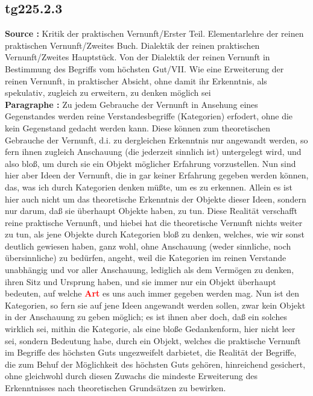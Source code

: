 \documentclass[a4paper,12pt,twoside]{book}
\newcommand{\match}[1]{\textcolor{red}{\textbf{#1}}}
\begin{document}
	\subsection*{tg225.2.3} 
	\textbf{Source : }Kritik der praktischen Vernunft/Erster Teil. Elementarlehre der reinen praktischen Vernunft/Zweites Buch. Dialektik der reinen praktischen Vernunft/Zweites Hauptstück. Von der Dialektik der reinen Vernunft in Bestimmung des Begriffs vom höchsten Gut/VII. Wie eine Erweiterung der reinen Vernunft, in praktischer Absicht, ohne damit ihr Erkenntnis, als spekulativ, zugleich zu erweitern, zu denken möglich sei\\  
	
	\noindent\textbf{Paragraphe : }Zu jedem Gebrauche der Vernunft in Ansehung eines Gegenstandes werden reine Verstandesbegriffe (Kategorien) erfodert, ohne die kein Gegenstand gedacht werden kann. Diese können zum theoretischen Gebrauche der Vernunft, d.i. zu dergleichen Erkenntnis nur angewandt werden, so fern ihnen zugleich Anschauung (die jederzeit sinnlich ist) untergelegt wird, und also bloß, um durch sie ein Objekt möglicher Erfahrung vorzustellen. Nun sind hier aber Ideen der Vernunft, die in gar keiner Erfahrung gegeben werden können, das, was ich durch Kategorien denken müßte, um es zu erkennen. Allein es ist hier auch nicht um das theoretische Erkenntnis der Objekte dieser Ideen, sondern nur darum, daß sie überhaupt Objekte haben, zu tun. Diese Realität verschafft reine praktische Vernunft, und hiebei hat die theoretische Vernunft nichts weiter zu tun, als jene Objekte durch Kategorien bloß zu denken, welches, wie wir sonst deutlich gewiesen haben, ganz wohl, ohne Anschauung (weder sinnliche, noch übersinnliche) zu bedürfen, angeht, weil die Kategorien im reinen Verstande unabhängig und vor aller Anschauung, lediglich als dem Vermögen zu denken, ihren Sitz und Ursprung haben, und sie immer nur ein Objekt überhaupt bedeuten, auf welche \match{Art} es uns auch immer gegeben werden mag. Nun ist den Kategorien, so fern sie auf jene Ideen angewandt werden sollen, zwar kein Objekt in der Anschauung zu geben möglich; es ist ihnen aber doch, daß ein solches wirklich sei, mithin die Kategorie, als eine bloße Gedankenform, hier nicht leer sei, sondern Bedeutung habe, durch ein Objekt, welches die praktische Vernunft im Begriffe des höchsten Guts ungezweifelt darbietet, die Realität der Begriffe, die zum Behuf der Möglichkeit des höchsten Guts gehören, hinreichend gesichert, ohne gleichwohl durch diesen Zuwachs die mindeste Erweiterung des Erkenntnisses nach theoretischen Grundsätzen zu bewirken. 
	
\end{document}
